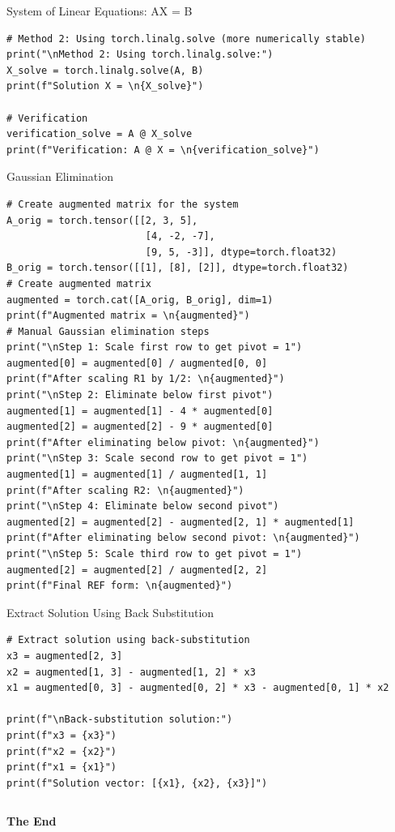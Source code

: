 \documentclass[aspectratio=169,xcolor=dvipsnames,svgnames,x11names,fleqn]{beamer}
\begin{document}
\begin{frame}[containsverbatim]{System of Linear Equations: AX = B}
\begin{verbatim}
# Method 2: Using torch.linalg.solve (more numerically stable)
print("\nMethod 2: Using torch.linalg.solve:")
X_solve = torch.linalg.solve(A, B)
print(f"Solution X = \n{X_solve}")

# Verification
verification_solve = A @ X_solve
print(f"Verification: A @ X = \n{verification_solve}")

\end{verbatim}
\end{frame}

\begin{frame}[containsverbatim]{Gaussian Elimination}
\begin{verbatim}
# Create augmented matrix for the system
A_orig = torch.tensor([[2, 3, 5], 
                        [4, -2, -7], 
                        [9, 5, -3]], dtype=torch.float32)
B_orig = torch.tensor([[1], [8], [2]], dtype=torch.float32)
# Create augmented matrix
augmented = torch.cat([A_orig, B_orig], dim=1)
print(f"Augmented matrix = \n{augmented}")
# Manual Gaussian elimination steps
print("\nStep 1: Scale first row to get pivot = 1")
augmented[0] = augmented[0] / augmented[0, 0]
print(f"After scaling R1 by 1/2: \n{augmented}")
print("\nStep 2: Eliminate below first pivot")
augmented[1] = augmented[1] - 4 * augmented[0]
augmented[2] = augmented[2] - 9 * augmented[0]
print(f"After eliminating below pivot: \n{augmented}")
print("\nStep 3: Scale second row to get pivot = 1")
augmented[1] = augmented[1] / augmented[1, 1]
print(f"After scaling R2: \n{augmented}")
print("\nStep 4: Eliminate below second pivot")
augmented[2] = augmented[2] - augmented[2, 1] * augmented[1]
print(f"After eliminating below second pivot: \n{augmented}")
print("\nStep 5: Scale third row to get pivot = 1")
augmented[2] = augmented[2] / augmented[2, 2]
print(f"Final REF form: \n{augmented}")
\end{verbatim}
\end{frame}



\begin{frame}[containsverbatim]{Extract Solution Using Back Substitution}
\begin{verbatim}
# Extract solution using back-substitution
x3 = augmented[2, 3]
x2 = augmented[1, 3] - augmented[1, 2] * x3
x1 = augmented[0, 3] - augmented[0, 2] * x3 - augmented[0, 1] * x2

print(f"\nBack-substitution solution:")
print(f"x3 = {x3}")
print(f"x2 = {x2}")
print(f"x1 = {x1}")
print(f"Solution vector: [{x1}, {x2}, {x3}]")
\end{verbatim}
\end{frame}

\begin{frame}[containsverbatim]{}
\begin{verbatim}
\end{verbatim}
\end{frame}



\begin{frame}
    \Huge{\centerline{\color{bubblegumPink}\textbf{The End}}}
\end{frame}
\end{document}
